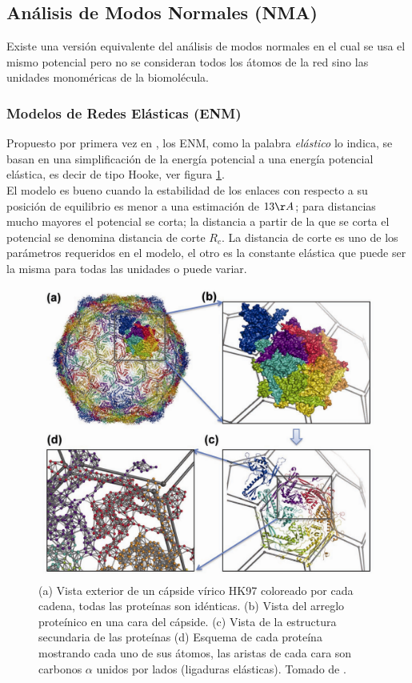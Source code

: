  \subsection{An\'{a}lisis de Modos Normales (NMA)}
Existe una versi\'{o}n equivalente del an\'{a}lisis de modos normales en el cual se usa el mismo potencial pero no se consideran todos los \'{a}tomos de la red sino las unidades monom\'{e}ricas de la biomol\'{e}cula.
\subsubsection{Modelos de Redes El\'{a}sticas (ENM)}
Propuesto por primera vez en \cite{Tirion1996}, los ENM, como la palabra \textit{el\'{a}stico} lo indica, se basan en una simplificaci\'{o}n de la energ\'{i}a potencial a una energ\'{i}a potencial el\'{a}stica, es decir de tipo Hooke, ver figura \ref{fig:pan}.\\



El modelo es bueno cuando la estabilidad de los enlaces con respecto a su posici\'{o}n de equilibrio es menor a una estimaci\'{o}n  de $13\AA$; para distancias mucho mayores el potencial se corta; la distancia a partir de la que se corta el potencial se denomina distancia de corte $R_c$. La distancia de corte es uno de los par\'{a}metros requeridos en el modelo, el otro es la constante el\'{a}stica que puede ser la misma para todas las unidades o puede variar.\\

\begin{figure}
\centering%
\includegraphics[scale=0.28]{Kap2/dibujo.pdf}%
\caption{ (a) Vista exterior de un c\'{a}pside v\'{i}rico HK97 coloreado por cada cadena, todas las prote\'{i}nas son id\'{e}nticas. (b) Vista del arreglo prote\'{i}nico en una cara del c\'{a}pside. (c) Vista de la estructura secundaria de las prote\'{i}nas (d) Esquema de cada prote\'{i}na mostrando cada uno de sus \'{a}tomos, las aristas de cada cara son carbonos $\alpha$ unidos por lados (ligaduras el\'{a}sticas). Tomado de \cite{Lezon2009}.} \label{fig:pan}
\end{figure}

